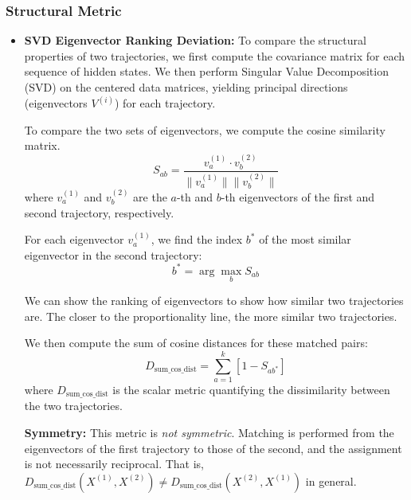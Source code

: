 \documentclass[a4paper,12pt]{article}
\begin{document}
\subsubsection{Structural Metric}
\begin{itemize}
        
    \item \textbf{SVD Eigenvector Ranking Deviation:} To compare the structural properties of two trajectories, we first compute the covariance matrix for each sequence of hidden states. We then perform Singular Value Decomposition (SVD) on the centered data matrices, yielding principal directions (eigenvectors $V^{(i)}$) for each trajectory.

    To compare the two sets of eigenvectors, we compute the cosine similarity matrix.
    \[
    S_{ab} = \frac{v^{(1)}_a \cdot v^{(2)}_b}{\|v^{(1)}_a\| \|v^{(2)}_b\|}
    \]
    where $v^{(1)}_a$ and $v^{(2)}_b$ are the $a$-th and $b$-th eigenvectors of the first and second trajectory, respectively.

    For each eigenvector $v^{(1)}_a$, we find the index $b^*$ of the most similar eigenvector in the second trajectory:
    \[
    b^* = \arg\max_b S_{ab}
    \]

    We can show the ranking of eigenvectors to show how similar two trajectories are. The closer to the proportionality line, the more similar two trajectories.

    We then compute the sum of cosine distances for these matched pairs:
    \[
    D_{\text{sum\_cos\_dist}} = \sum_{a=1}^k \left[1 - S_{a b^*}\right]
    \]
    where $D_{\text{sum\_cos\_dist}}$ is the scalar metric quantifying the dissimilarity between the two trajectories.

    \textbf{Symmetry:} This metric is \emph{not symmetric}. Matching is performed from the eigenvectors of the first trajectory to those of the second, and the assignment is not necessarily reciprocal. That is, $D_{\text{sum\_cos\_dist}}(X^{(1)}, X^{(2)}) \neq D_{\text{sum\_cos\_dist}}(X^{(2)}, X^{(1)})$ in general.




\end{itemize}
\end{document}
